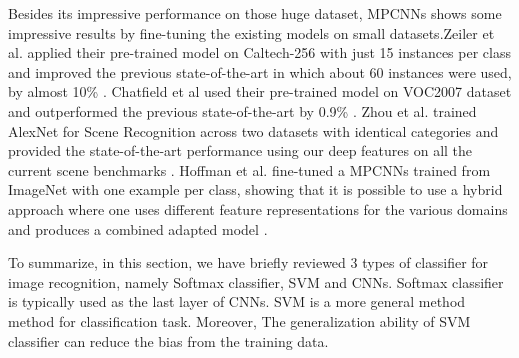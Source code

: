 Besides its impressive performance on those huge dataset, MPCNNs shows some impressive results by fine-tuning the existing models on small datasets.Zeiler et al. applied their pre-trained model on Caltech-256 with just 15 instances per class and improved the previous state-of-the-art in which about 60 instances were used, by almost 10\% \cite{zeiler2014visualizing}. Chatfield et al used their pre-trained model on VOC2007 dataset and outperformed the previous state-of-the-art by 0.9\% \cite{Chatfield14}. Zhou et al. trained AlexNet for Scene Recognition across two datasets with identical categories and provided the state-of-the-art performance using our deep features on all the current scene benchmarks \cite{NIPS2014_Zhou}. Hoffman et al. fine-tuned a MPCNNs trained from ImageNet with one example per class, showing that it is possible to use a hybrid approach where one uses different feature representations for the various domains
and produces a combined adapted model \cite{hoffman2013one}.
 
To summarize, in this section, we have briefly reviewed 3 types of classifier for image recognition, namely Softmax classifier, SVM and CNNs. Softmax classifier is typically used as the last layer of CNNs. SVM is a more general method method for classification task. Moreover, The generalization ability of SVM classifier can reduce the bias from the training data.
